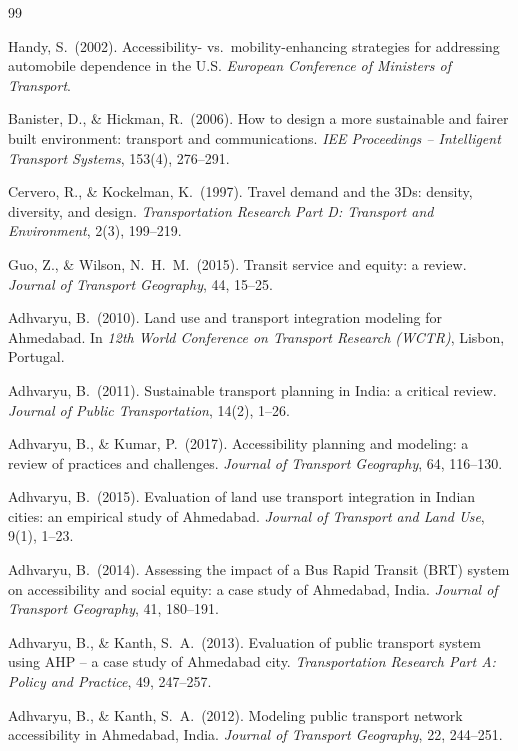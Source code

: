 \documentclass[11pt]{article}
\begin{document}
\begin{thebibliography}{99}

Handy, S.\ (2002). Accessibility- vs.\ mobility-enhancing strategies for addressing automobile
dependence in the U.S. \textit{European Conference of Ministers of Transport}.

Banister, D., \& Hickman, R.\ (2006). How to design a more sustainable and fairer built
environment: transport and communications. \textit{IEE Proceedings -- Intelligent Transport
Systems}, 153(4), 276--291.

Cervero, R., \& Kockelman, K.\ (1997). Travel demand and the 3Ds: density, diversity, and
design. \textit{Transportation Research Part D: Transport and Environment}, 2(3), 199--219.

Guo, Z., \& Wilson, N.\ H.\ M.\ (2015). Transit service and equity: a review. \textit{Journal of
Transport Geography}, 44, 15--25.

Adhvaryu, B.\ (2010). Land use and transport integration modeling for Ahmedabad. In
\textit{12th World Conference on Transport Research (WCTR)}, Lisbon, Portugal.

Adhvaryu, B.\ (2011). Sustainable transport planning in India: a critical review. \textit{Journal
of Public Transportation}, 14(2), 1--26.

Adhvaryu, B., \& Kumar, P.\ (2017). Accessibility planning and modeling: a review of practices
and challenges. \textit{Journal of Transport Geography}, 64, 116--130.

Adhvaryu, B.\ (2015). Evaluation of land use transport integration in Indian cities: an
empirical study of Ahmedabad. \textit{Journal of Transport and Land Use}, 9(1), 1--23.

Adhvaryu, B.\ (2014). Assessing the impact of a Bus Rapid Transit (BRT) system on accessibility
and social equity: a case study of Ahmedabad, India. \textit{Journal of Transport Geography}, 41,
180--191.

Adhvaryu, B., \& Kanth, S.\ A.\ (2013). Evaluation of public transport system using
AHP -- a case study of Ahmedabad city. \textit{Transportation Research Part A: Policy and
Practice}, 49, 247--257.

Adhvaryu, B., \& Kanth, S.\ A.\ (2012). Modeling public transport network accessibility in
Ahmedabad, India. \textit{Journal of Transport Geography}, 22, 244--251.


\end{thebibliography}
\end{document}
